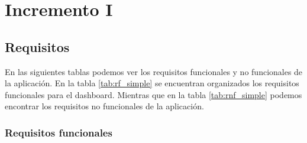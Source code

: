 \chapter{Incremento I}

\section{Requisitos}

En las siguientes tablas podemos ver los requisitos funcionales y no funcionales de la aplicación. En la tabla \ref{tab:rf_simple} se encuentran organizados los requisitos funcionales para el dashboard. Mientras que en la tabla \ref{tab:rnf_simple} podemos encontrar los requisitos no funcionales de la aplicación.


\subsection{Requisitos funcionales}


